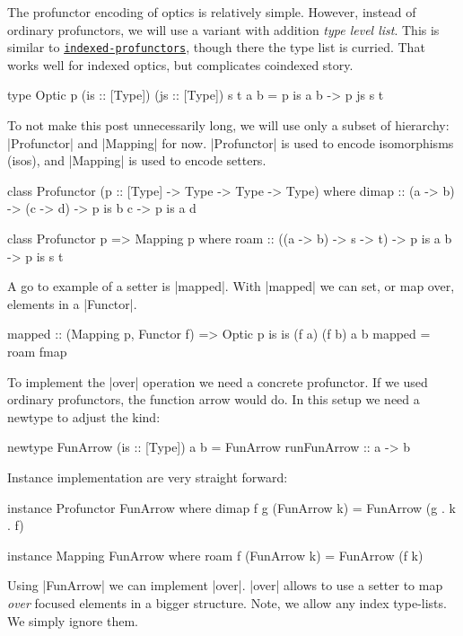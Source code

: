 The profunctor encoding of optics is relatively simple.
However, instead of ordinary profunctors, we will
use a variant with addition \emph{type level list}.
This is similar to
\href{https://hackage.haskell.org/package/indexed-profunctors}{\texttt{indexed-profunctors}},
though there the type list is curried.
That works well for indexed optics, but complicates coindexed story.

\begin{code}
type Optic p (is :: [Type]) (js :: [Type]) s t a b = p is a b -> p js s t
\end{code}

To not make this post unnecessarily long,
we will use only a subset of hierarchy: |Profunctor| and |Mapping| for now.
|Profunctor| is used to encode isomorphisms (isos),
and |Mapping| is used to encode setters.

\begin{code}
class Profunctor (p :: [Type] -> Type -> Type -> Type) where
    dimap :: (a -> b) -> (c -> d) -> p is b c -> p is a d

class Profunctor p => Mapping p where
    roam :: ((a -> b) -> s -> t) -> p is a b -> p is s t
\end{code}

A go to example of a setter is |mapped|.
With |mapped| we can set, or map over, elements in a |Functor|.

\begin{code}
mapped :: (Mapping p, Functor f)
       => Optic p is is (f a) (f b) a b
mapped = roam fmap
\end{code}

To implement the |over| operation we need a concrete profunctor.
If we used ordinary profunctors, the function arrow would do.
In this setup we need a newtype to adjust the kind:

\begin{code}
newtype FunArrow (is :: [Type]) a b =
    FunArrow { runFunArrow :: a  -> b }
\end{code}

Instance implementation are very straight forward:

\begin{code}
instance Profunctor FunArrow where
    dimap f g (FunArrow k) = FunArrow (g . k . f)

instance Mapping FunArrow where
    roam f (FunArrow k) = FunArrow (f k)
\end{code}

Using |FunArrow| we can implement |over|.
|over| allows to use a setter to map \emph{over} focused elements
in a bigger structure.
Note, we allow any index type-lists.
We simply ignore them.

